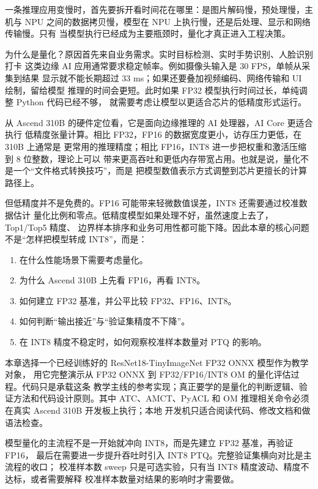 一条推理应用变慢时，首先要拆开看时间花在哪里：是图片解码慢，预处理慢，主机与
NPU 之间的数据拷贝慢，模型在 NPU
上执行慢，还是后处理、显示和网络传输慢。只有
当模型执行已经成为主要瓶颈时，量化才真正进入工程决策。

为什么是量化？原因首先来自业务需求。实时目标检测、实时手势识别、人脸识别打卡
这类边缘 AI 应用通常要求稳定帧率。例如摄像头输入是 30
FPS，单帧从采集到结果 显示就不能长期超过 33
ms；如果还要叠加视频编码、网络传输和 UI 绘制，留给模型
推理的时间会更短。此时如果 FP32 模型执行时间过长，单纯调整 Python
代码已经不够， 就需要考虑让模型以更适合芯片的低精度形式运行。

从 Ascend 310B 的硬件定位看，它是面向边缘推理的 AI 处理器，AI Core
更适合执行 低精度张量计算。相比 FP32，FP16
的数据宽度更小，访存压力更低，在 310B 上通常是 更常用的推理精度；相比
FP16，INT8 进一步把权重和激活压缩到 8 位整数，理论上可以
带来更高吞吐和更低内存带宽占用。也就是说，量化不是一个``文件格式转换技巧''，而是
把模型数值表示方式调整到芯片更擅长的计算路径上。

但低精度并不是免费的。FP16 可能带来轻微数值误差，INT8
还需要通过校准数据估计
量化比例和零点。低精度模型如果处理不好，虽然速度上去了，Top1/Top5 精度、
边界样本排序和业务可用性都可能下降。因此本章的核心问题不是``怎样把模型转成
INT8''，而是：

\begin{enumerate}
\def\labelenumi{\arabic{enumi}.}
\tightlist
\item
  在什么性能场景下需要考虑量化。
\item
  为什么 Ascend 310B 上先看 FP16，再看 INT8。
\item
  如何建立 FP32 基准，并公平比较 FP32、FP16、INT8。
\item
  如何判断``输出接近''与``验证集精度不下降''。
\item
  在 INT8 精度不稳定时，如何观察校准样本数量对 PTQ 的影响。
\end{enumerate}

本章选择一个已经训练好的 ResNet18-TinyImageNet FP32 ONNX
模型作为教学对象， 用它完整演示从 FP32 ONNX 到 FP32/FP16/INT8 OM
的量化评估过程。代码只是承载这条
教学主线的参考实现；真正要学的是量化的判断逻辑、验证方法和代码设计原则。其中
ATC、AMCT、PyACL 和 OM 推理相关命令必须在真实 Ascend 310B
开发板上执行；本地 开发机只适合阅读代码、修改文档和做语法检查。

模型量化的主流程不是一开始就冲向 INT8，而是先建立 FP32 基准，再验证
FP16， 最后在需要进一步提升吞吐时引入 INT8
PTQ。完整验证集横向对比是主流程的收口； 校准样本数 sweep
只是可选实验，只有当 INT8 精度波动、精度不达标，或者需要解释
校准样本数量对结果的影响时才需要做。

